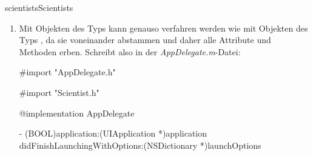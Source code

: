 \documentclass[parskip=half, final]{scrreprt}
\begin{document}
\begin{lsg}
\begin{lsgitem}{scientists}{Scientists}
\begin{enumerate}
\begin{objclst}
#import "Person.h"

@interface Scientist : Person

- (void)sayPrimeNumbersUpTo:(int)number;

@end
\end{objclst}

Anschließend können wir sie in der Main-Datei implementieren:

\begin{objclst}
#import "Scientist.h"

@implementation Scientist

- (void)sayPrimeNumbersUpTo:(int)number {
    // Algorithmus aus Aufgabe 'Primzahlen'
}

@end
\end{objclst}

In der nun schon häufiger verwendeten  Methode in der \emph{AppDelegate.m}-Datei, wollen wir die neue Klasse ausprobieren:

\begin{objclst}
#import "AppDelegate.h"

#import "Scientist.h"

@implementation AppDelegate

- (BOOL)application:(UIApplication *)application didFinishLaunchingWithOptions:(NSDictionary *)launchOptions {
    
    Scientist *aScientist = [[Scientist alloc] init];
    [aScientist sayPrimeNumbersUpTo:100];

    return YES;
}

@end
\end{objclst}

Führen wir die App aus, werden alle Primzahlen bis 100 in der Konsole ausgegeben.

\item Mit Objekten des Typs  kann genauso verfahren werden wie mit Objekten des Typs , da sie voneinander abstammen und daher alle Attribute und Methoden erben. Schreibt also in der \emph{AppDelegate.m}-Datei:

\begin{objclst}
#import "AppDelegate.h"

#import "Scientist.h"

@implementation AppDelegate

- (BOOL)application:(UIApplication *)application didFinishLaunchingWithOptions:(NSDictionary *)launchOptions {
    
}
\end{objclst}
\end{enumerate}
\end{lsgitem}
\end{lsg}
\end{document}
